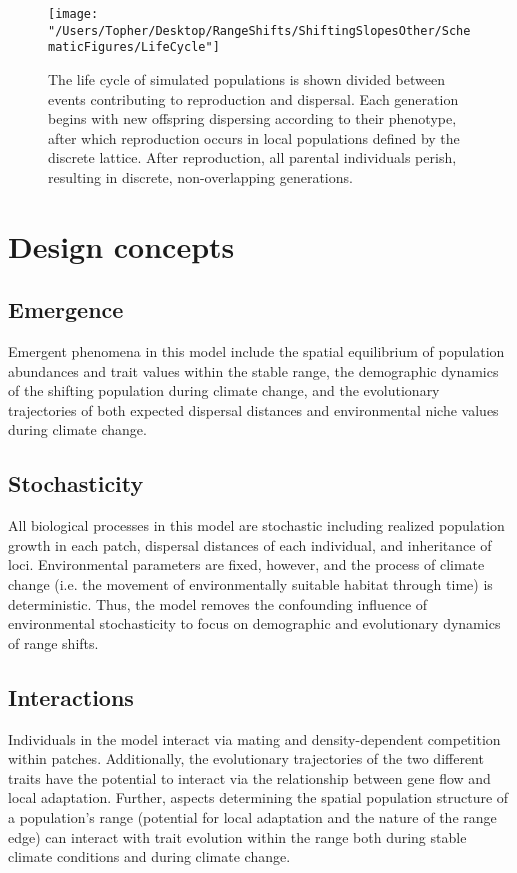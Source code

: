\documentclass[12pt, oneside]{article}
\begin{document}
\begin{figure}
\centering
\texttt{[image: "/Users/Topher/Desktop/RangeShifts/ShiftingSlopesOther/SchematicFigures/LifeCycle"]}
\vspace{-5mm}
\caption[LoF entry]{The life cycle of simulated populations is shown divided between events contributing to reproduction and dispersal. Each generation begins with new offspring dispersing according to their phenotype, after which reproduction occurs in local populations defined by the discrete lattice. After reproduction, all parental individuals perish, resulting in discrete, non-overlapping generations.}
\label{fig:LifeCycle}
\end{figure}

\section*{Design concepts}
\subsection*{Emergence} 
Emergent phenomena in this model include the spatial equilibrium of population abundances and trait values within the stable range, the demographic dynamics of the shifting population during climate change, and the evolutionary trajectories of both expected dispersal distances and environmental niche values during climate change.

\subsection*{Stochasticity} 
All biological processes in this model are stochastic including realized population growth in each patch, dispersal distances of each individual, and inheritance of loci. Environmental parameters are fixed, however, and the process of climate change (i.e. the movement of environmentally suitable habitat through time) is deterministic. Thus, the model removes the confounding influence of environmental stochasticity to focus on demographic and evolutionary dynamics of range shifts.

\subsection*{Interactions} 
Individuals in the model interact via mating and density-dependent competition within patches. Additionally, the evolutionary trajectories of the two different traits have the potential to interact via the relationship between gene flow and local adaptation. Further, aspects determining the spatial population structure of a population's range (potential for local adaptation and the nature of the range edge) can interact with trait evolution within the range both during stable climate conditions and during climate change.
\end{document}
